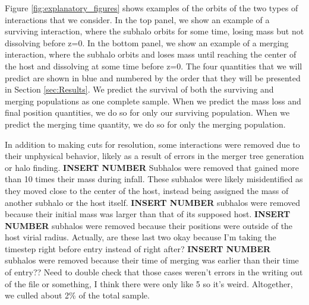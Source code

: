 \documentclass[fleqn,usenatbib]{mnras}
\newcommand\edits[1]{{\color{red}#1}}
\begin{document}
\par    
    Figure \ref{fig:explanatory_figures} shows examples of the orbits of the two types of interactions that we consider. In the top panel, we show an example of a surviving interaction, where the subhalo orbits for some time, losing mass but not dissolving before z=0. In the bottom panel, we show an example of a merging interaction, where the subhalo orbits and loses mass until reaching the center of the host and dissolving at some time before z=0. The four quantities that we will predict are shown in blue and numbered by the order that they will be presented in Section \ref{sec:Results}. We predict the survival of both the surviving and merging populations as one complete sample. When we predict the mass loss and final position quantities, we do so for only our surviving population. When we predict the merging time quantity, we do so for only the merging population. 
\par
    In addition to making cuts for resolution, some interactions were removed due to their unphysical behavior, likely as a result of errors in the merger tree generation or halo finding. \textbf{INSERT NUMBER} Subhalos were removed that gained more than 10 times their mass during infall. These subhalos were likely misidentified as they moved close to the center of the host, instead being assigned the mass of another subhalo or the host itself. \textbf{INSERT NUMBER} subhalos were removed because their initial mass was larger than that of its supposed host. \textbf{INSERT NUMBER} subhalos were removed because their positions were outside of the host virial radius. \edits{Actually, are these last two okay because I'm taking the timestep right before entry instead of right after?} \textbf{INSERT NUMBER} subhalos were removed because their time of merging was earlier than their time of entry?? \edits{Need to double check that those cases weren't errors in the writing out of the file or something, I think there were only like 5 so it's weird.} Altogether, we culled about 2\% of the total sample.
\par
\par
\end{document}
